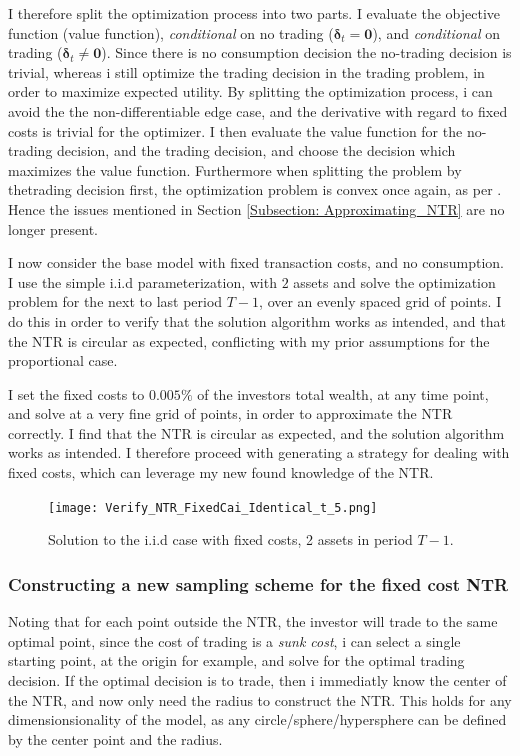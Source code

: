 \documentclass[11pt]{article}
\begin{document}
I therefore split the optimization process into two parts. I evaluate the objective function (value function), \textit{conditional} on no trading ($\boldsymbol{\delta}_{t} = \mathbf{0}$), and \textit{conditional} on trading ($\boldsymbol{\delta}_{t} \neq \mathbf{0}$).
Since there is no consumption decision the no-trading decision is trivial, whereas i still optimize the trading decision in the trading problem, in order to maximize expected utility. 
By splitting the optimization process, i can avoid the the non-differentiable edge case, and the derivative with regard to fixed costs is trivial for the optimizer.
I then evaluate the value function for the no-trading decision, and the trading decision, and choose the decision which maximizes the value function.
Furthermore when splitting the problem by thetrading decision first, the optimization problem is convex once again, as per \autocite{Dybvig2020}. Hence the issues mentioned in Section \ref{Subsection: Approximating_NTR} are no longer present.

I now consider the base model with fixed transaction costs, and no consumption. I use the simple i.i.d parameterization, with $2$ assets and solve the optimization problem for the next to last period $T-1$,
over an evenly spaced grid of points. I do this in order to verify that the solution algorithm works as intended, and that the \ac{NTR} is circular as expected, conflicting with my prior assumptions for the proportional case.

I set the fixed costs to $0.005\%$ of the investors total wealth, at any time point, and solve at a very fine grid of points, in order to approximate the \ac{NTR} correctly.
I find that the \ac{NTR} is circular as expected, and the solution algorithm works as intended. I therefore proceed with generating a strategy for dealing with fixed costs, which can leverage my new found knowledge of the \ac{NTR}.
\begin{figure}[!ht]
    \centering
    \texttt{[image: Verify\_NTR\_FixedCai\_Identical\_t\_5.png]}
    \caption{Solution to the i.i.d case with fixed costs, 2 assets in period $T-1$.}
    \label{fig:NTR_verify_fixed_no_correlation}
\end{figure}

\subsubsection{Constructing a new sampling scheme for the fixed cost NTR} \label{Subsubsection: SampleFixed}
Noting that for each point outside the NTR, the investor will trade to the same optimal point, since the cost of trading is a \textit{sunk cost},
i can select a single starting point, at the origin for example, and solve for the optimal trading decision.
If the optimal decision is to trade, then i immediatly know the center of the \ac{NTR}, and now only need the radius to construct the \ac{NTR}.
This holds for any dimensionsionality of the model, as any circle/sphere/hypersphere can be defined by the center point and the radius.
\end{document}
